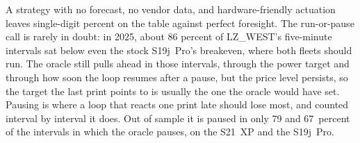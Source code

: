 A strategy with no forecast, no vendor data, and hardware-friendly actuation leaves single-digit percent on the table against perfect foresight. The run-or-pause call is rarely in doubt: in 2025, about 86 percent of LZ\_WEST's five-minute intervals sat below even the stock S19j~Pro's breakeven, where both fleets should run. %
The oracle still pulls ahead in those intervals, through the power target and through how soon the loop resumes after a pause, but the price level persists, so the target the last print points to is usually the one the oracle would have set. %
Pausing is where a loop that reacts one print late should lose most, and counted interval by interval it does. Out of sample it is paused in only 79 and 67~percent of the intervals in which the oracle pauses, on the S21~XP and the S19j~Pro. %
